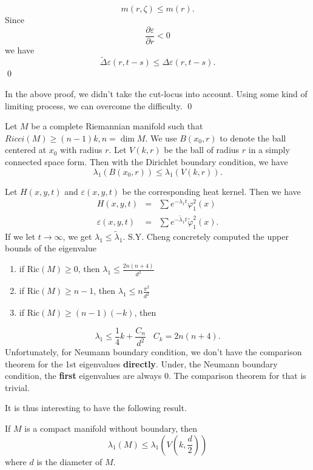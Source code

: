 \[ m (r, \zeta ) \leq m (r). \]
%
Since 
\[ \frac{\partial \varepsilon}{\partial r} < 0 \]
%
we have 
%
\[ \tilde{\Delta} \varepsilon (r, t-s) \leq \Delta \varepsilon (r, t - s). \]
\qed

In the above proof, we didn't take the cut-locus into account. Using some kind of limiting process, we can overcome the difficulty.
\qed

\begin{theorem}Let $M$ be a complete Riemannian manifold such that $ Ricci (M) \geq (n-1) k , n = \dim M$. We use $ B (x_0, r) $ to denote the ball centered at $ x _0$ with radius $r$. Let $ V (k, r)$ be the ball of radius $r$ in a simply connected space form. Then with the Dirichlet boundary condition, we have 
%
\[ \lambda _1 (B (x_0, r)) \leq \lambda _1 (V (k, r)).\]
\end{theorem}

 Let $H(x, y, t) $ and $ \varepsilon (x, y, t) $ be the corresponding heat kernel. Then we have 
%
\begin{eqnarray*}
 H (x, y, t) &=& \sum e^{-\lambda _1t}  \varphi ^2 _1 (x) \\
\varepsilon (x, y, t) & = & \sum e^{-\tilde{\lambda} _1t}  \tilde{\varphi} ^2 _1 (x).
\end{eqnarray*}
If we let $ t \rightarrow \infty$, we get $ \lambda _1 \leq \tilde{\lambda}_1 $.
S.Y. Cheng concretely computed the upper bounds of the eigenvalue
\begin{enumerate}
  \item if   Ric$(M) \geq 0$, then $ \lambda _1 \leq \frac{2n(n+4)}{d^2} $ 
  \item if   Ric$(M) \geq n-1$, then $ \lambda _1  \leq n\frac{\pi^2}{d^2} $
  \item if   Ric$(M) \geq (n-1) (-k) $, then 
  \end{enumerate}  
\[ \lambda_1 \leq \frac{1}{4} k + \frac{C_n}{d^2} \;\;\; C_k = 2n (n+4).\]
%
Unfortunately, for Neumann boundary condition, we don't have the comparison theorem for the 1st eigenvalues {\bf directly}. Under, the Neumann boundary condition, the {\bf first} eigenvalues are always 0. The comparison theorem for that is trivial.

It is thus interesting to have the following result.

\begin{theorem}If $M$ is a compact manifold without boundary, then 
%
\[ \lambda _1 (M) \leq \lambda _1 \left(V \left(k, \frac{d}{2}\right)\right)\]
%
where $d$ is the diameter of $M$.
\end{theorem}

